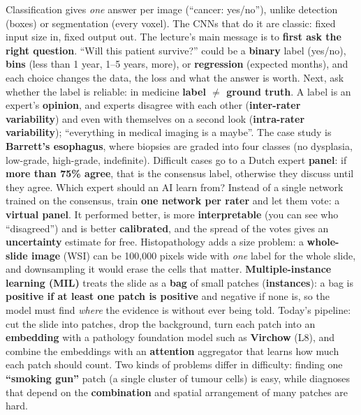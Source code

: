 \documentclass[a4paper]{article}
\newcommand{\K}[1]{\textcolor{kg}{\textbf{#1}}}
\newcommand{\E}[1]{\textcolor{ep}{#1}}
\begin{document}
Classification gives \emph{one} answer per image (\E{``cancer: yes/no''}), unlike detection (boxes) or segmentation (every voxel). The CNNs that do it are classic: fixed input size in, fixed output out. The lecture's main message is to \K{first ask the right question}. ``Will this patient survive?'' could be a \K{binary} label (yes/no), \K{bins} (less than 1 year, 1--5 years, more), or \K{regression} (expected months), and each choice changes the data, the loss and what the answer is worth. Next, ask whether the label is reliable: in medicine \K{label $\neq$ ground truth}. A label is an expert's \K{opinion}, and experts disagree with each other (\K{inter-rater variability}) and even with themselves on a second look (\K{intra-rater variability}); ``everything in medical imaging is a maybe''. The case study is \K{Barrett's esophagus}, where biopsies are graded into four classes (no dysplasia, low-grade, high-grade, indefinite). Difficult cases go to a Dutch expert \K{panel}: if \K{more than 75\% agree}, that is the consensus label, otherwise they discuss until they agree. Which expert should an AI learn from? Instead of a single network trained on the consensus, train \K{one network per rater} and let them vote: a \K{virtual panel}. It performed better, is more \K{interpretable} (you can see who ``disagreed'') and is better \K{calibrated}, and the spread of the votes gives an \K{uncertainty} estimate for free.
Histopathology adds a size problem: a \K{whole-slide image} (WSI) can be 100{,}000 pixels wide with \emph{one} label for the whole slide, and downsampling it would erase the cells that matter. \K{Multiple-instance learning (MIL)} treats the slide as a \K{bag} of small patches (\K{instances}): a bag is \K{positive if at least one patch is positive} and negative if none is, so the model must find \emph{where} the evidence is without ever being told. Today's pipeline: cut the slide into patches, drop the background, turn each patch into an \K{embedding} with a pathology foundation model such as \K{Virchow} (L8), and combine the embeddings with an \K{attention} aggregator that learns how much each patch should count. Two kinds of problems differ in difficulty: finding one \K{``smoking gun''} patch (\E{a single cluster of tumour cells}) is easy, while diagnoses that depend on the \K{combination} and spatial arrangement of many patches are hard.
\end{document}
